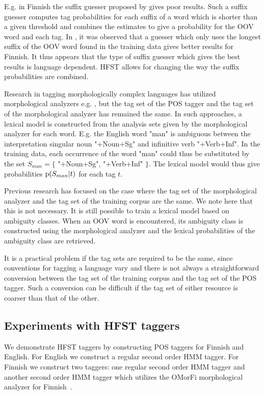 \documentclass{llncs}
\begin{document}
E.g. in Finnish the suffix guesser proposed by \cite{Brants:2000} gives
poor results. Such a suffix guesser computes tag probabilities for
each suffix of a word which is shorter than a given threshold and
combines the estimates to give a probability for the OOV word and
each tag. In \cite{silfverberg/2011/nodalida}, it was observed that a guesser
which only uses the longest suffix of the OOV word found in the
training data gives better results for Finnish. It thus appears that the type of suffix
guesser which gives the best results is language dependent. HFST
allows for changing the way the suffix probabilities are combined.

Research in tagging morphologically complex languages has utilized
morphological analyzers e.g. \cite{Tzoukerman:1996,Oravecz:2002}, but
the tag set of the POS tagger and the tag set of the
morphological analyzer has remained the same. In such approaches, a
lexical model is constructed from the analysis sets given by the
morphological analyzer for each word. E.g. the English word "man" is
ambiguous between the interpretation singular noun "+Noun+Sg" and
infinitive verb "+Verb+Inf". In the training data, each occurrence of
the word "man" could thus be substituted by the set $S_{man} = \{$
"+Noun+Sg", "+Verb+Inf" $\}$. The lexical model would thus give
probabilities ${\rm p}(S_{man}|t)$ for each tag $t$. 

Previous research has focused on the case where the tag set of the
morphological analyzer and the tag set of the training corpus are the
same. We note here that this is not necessary.
It is still possible to train a lexical model based on
ambiguity classes. When an OOV word is encountered, its ambiguity
class is constructed using the morphological analyzer and the lexical
probabilities of the ambiguity class are retrieved.

It is a practical problem if the tag sets are required to be the
same, since conventions for tagging a
language vary and there is not always a straightforward conversion
between the tag set of the training corpus and the tag set of the
POS tagger. Such a conversion can be difficult if the tag
set of either resource is coarser than that of the other.

\subsection{Experiments with HFST taggers}

We demonstrate HFST taggers by constructing POS taggers for Finnish
and English. For English we construct a regular second order HMM
tagger. For Finnish we construct two taggers: one regular second
order HMM tagger and another second order HMM tagger which utilizes
the OMorFi morphological analyzer for Finnish~\cite{pirinen/2008}.
\end{document}
